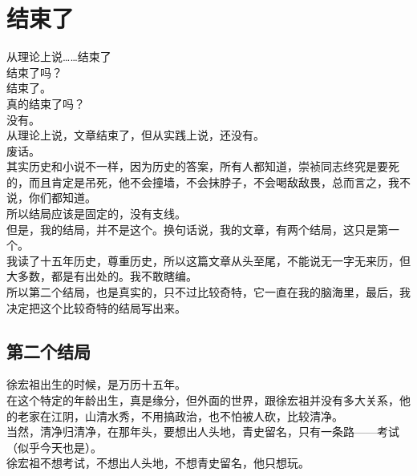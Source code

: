 \section{结束了}
\ifnum{}
	\begin{multicols}{\theparacolNo}
\fi
从理论上说……结束了\\

结束了吗？\\

结束了。\\

真的结束了吗？\\

没有。\\

从理论上说，文章结束了，但从实践上说，还没有。\\

废话。\\

其实历史和小说不一样，因为历史的答案，所有人都知道，崇祯同志终究是要死的，而且肯定是吊死，他不会撞墙，不会抹脖子，不会喝敌敌畏，总而言之，我不说，你们都知道。\\

所以结局应该是固定的，没有支线。\\

但是，我的结局，并不是这个。换句话说，我的文章，有两个结局，这只是第一个。\\

我读了十五年历史，尊重历史，所以这篇文章从头至尾，不能说无一字无来历，但大多数，都是有出处的。我不敢瞎编。\\

所以第二个结局，也是真实的，只不过比较奇特，它一直在我的脑海里，最后，我决定把这个比较奇特的结局写出来。\\

\subsection{第二个结局}
徐宏祖出生的时候，是万历十五年。\\

在这个特定的年龄出生，真是缘分，但外面的世界，跟徐宏祖并没有多大关系，他的老家在江阴，山清水秀，不用搞政治，也不怕被人砍，比较清净。\\

当然，清净归清净，在那年头，要想出人头地，青史留名，只有一条路——考试（似乎今天也是）。\\

徐宏祖不想考试，不想出人头地，不想青史留名，他只想玩。\\


\end{multicols}
